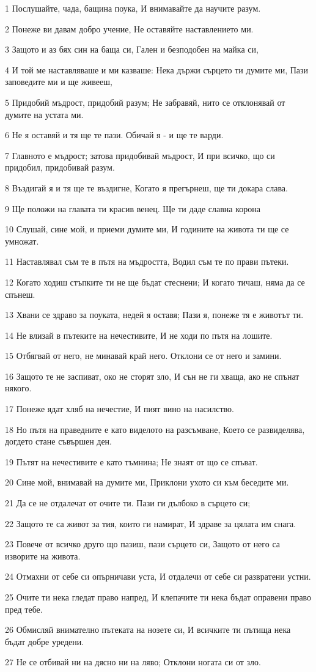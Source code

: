 \par 1 Послушайте, чада, бащина поука, И внимавайте да научите разум.
\par 2 Понеже ви давам добро учение, Не оставяйте наставлението ми.
\par 3 Защото и аз бях син на баща си, Гален и безподобен на майка си,
\par 4 И той ме наставляваше и ми казваше: Нека държи сърцето ти думите ми, Пази заповедите ми и ще живееш,
\par 5 Придобий мъдрост, придобий разум; Не забравяй, нито се отклонявай от думите на устата ми.
\par 6 Не я оставяй и тя ще те пази. Обичай я - и ще те варди.
\par 7 Главното е мъдрост; затова придобивай мъдрост, И при всичко, що си придобил, придобивай разум.
\par 8 Въздигай я и тя ще те въздигне, Когато я прегърнеш, ще ти докара слава.
\par 9 Ще положи на главата ти красив венец. Ще ти даде славна корона
\par 10 Слушай, сине мой, и приеми думите ми, И годините на живота ти ще се умножат.
\par 11 Наставлявал съм те в пътя на мъдростта, Водил съм те по прави пътеки.
\par 12 Когато ходиш стъпките ти не ще бъдат стеснени; И когато тичаш, няма да се спънеш.
\par 13 Хвани се здраво за поуката, недей я оставя; Пази я, понеже тя е животът ти.
\par 14 Не влизай в пътеките на нечестивите, И не ходи по пътя на лошите.
\par 15 Отбягвай от него, не минавай край него. Отклони се от него и замини.
\par 16 Защото те не заспиват, око не сторят зло, И сън не ги хваща, ако не спънат някого.
\par 17 Понеже ядат хляб на нечестие, И пият вино на насилство.
\par 18 Но пътя на праведните е като виделото на разсъмване, Което се развиделява, догдето стане съвършен ден.
\par 19 Пътят на нечестивите е като тъмнина; Не знаят от що се спъват.
\par 20 Сине мой, внимавай на думите ми, Приклони ухото си към беседите ми.
\par 21 Да се не отдалечат от очите ти. Пази ги дълбоко в сърцето си;
\par 22 Защото те са живот за тия, които ги намират, И здраве за цялата им снага.
\par 23 Повече от всичко друго що пазиш, пази сърцето си, Защото от него са изворите на живота.
\par 24 Отмахни от себе си опърничави уста, И отдалечи от себе си развратени устни.
\par 25 Очите ти нека гледат право напред, И клепачите ти нека бъдат оправени право пред тебе.
\par 26 Обмисляй внимателно пътеката на нозете си, И всичките ти пътища нека бъдат добре уредени.
\par 27 Не се отбивай ни на дясно ни на ляво; Отклони ногата си от зло.

